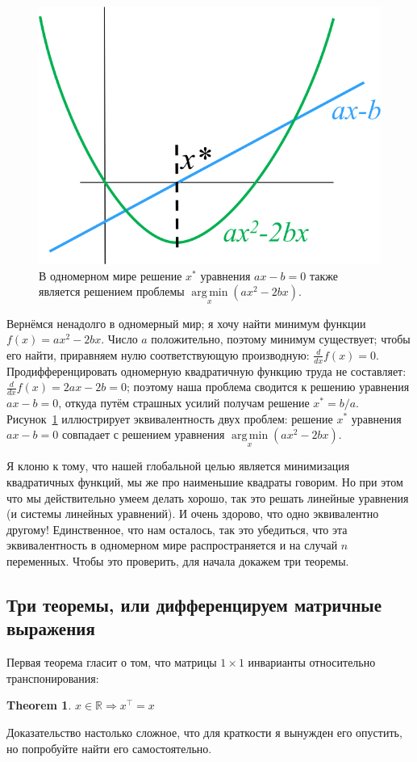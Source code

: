 \documentclass[notitlepage]{report}
\DeclareMathOperator*{\argmin}{arg\,min}
\newtheorem{theorem}{Theorem}
\begin{document}
\begin{figure}[ht]
	\centering
	\includegraphics[width=.3\linewidth]{minpb1d}
	\caption{В одномерном мире решение $x^*$ уравнения $ax - b = 0$ также является решением проблемы $\argmin\limits_x(ax^2-2bx)$. }
	\label{fig:min1d}
\end{figure}

Вернёмся ненадолго в одномерный мир; я хочу найти минимум функции $f(x) = ax^2 - 2bx$. Число $a$ положительно, поэтому минимум существует; чтобы его найти, приравняем нулю соответствующую производную: $\frac{d}{dx}f(x) = 0$. Продифференцировать одномерную квадратичную функцию труда не составляет: $\frac{d}{dx}f(x) = 2ax - 2b = 0$; поэтому наша проблема сводится к решению уравнения $ax-b=0$, откуда
путём страшных усилий получам решение $x^* = b/a$. Рисунок~\ref{fig:min1d} иллюстрирует эквивалентность двух проблем: решение $x^*$ уравнения $ax-b=0$ совпадает с решением уравнения $\argmin\limits_x(ax^2 - 2bx)$.

Я клоню к тому, что нашей глобальной целью является минимизация квадратичных функций, мы же про наименьшие квадраты говорим. Но при этом что мы действительно умеем делать хорошо, так это решать линейные уравнения (и системы линейных уравнений). И очень здорово, что одно эквивалентно другому!
Единственное, что нам осталось, так это убедиться, что эта эквивалентность в одномерном мире распространяется и на случай $n$ переменных. Чтобы это проверить, для начала докажем три теоремы.

\subsection{Три теоремы, или дифференцируем матричные выражения}
Первая теорема гласит о том, что матрицы $1\times 1$ инварианты относительно транспонирования:
\begin{theorem}
$x\in \mathbb R \Rightarrow x^\top = x$
\end{theorem}
Доказательство настолько сложное, что для краткости я вынужден его опустить, но попробуйте найти его самостоятельно.
\end{document}

